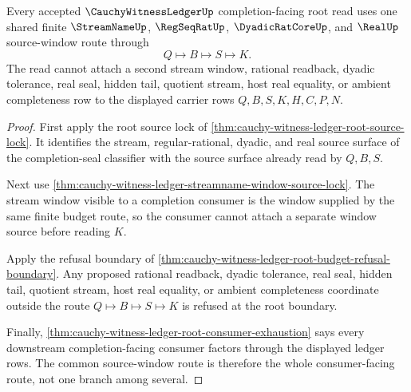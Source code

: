 \begin{theorem}
\label{thm:cauchy-witness-ledger-root-source-window-route-lock}
Every accepted $\CauchyWitnessLedgerUp$ completion-facing root read uses one shared finite $\StreamNameUp$, $\RegSeqRatUp$, $\DyadicRatCoreUp$, and $\RealUp$ source-window route through
$$
Q \longmapsto B \longmapsto S \longmapsto K.
$$
The read cannot attach a second stream window, rational readback, dyadic tolerance, real seal, hidden tail, quotient stream, host real equality, or ambient completeness row to the displayed carrier rows $Q,B,S,K,H,C,P,N$.
\end{theorem}
\begin{proof}
First apply the root source lock of \autoref{thm:cauchy-witness-ledger-root-source-lock}. It identifies the stream, regular-rational, dyadic, and real source surface of the completion-seal classifier with the source surface already read by $Q,B,S$.

Next use \autoref{thm:cauchy-witness-ledger-streamname-window-source-lock}. The stream window visible to a completion consumer is the window supplied by the same finite budget route, so the consumer cannot attach a separate window source before reading $K$.

Apply the refusal boundary of \autoref{thm:cauchy-witness-ledger-root-budget-refusal-boundary}. Any proposed rational readback, dyadic tolerance, real seal, hidden tail, quotient stream, host real equality, or ambient completeness coordinate outside the route $Q \longmapsto B \longmapsto S \longmapsto K$ is refused at the root boundary.

Finally, \autoref{thm:cauchy-witness-ledger-root-consumer-exhaustion} says every downstream completion-facing consumer factors through the displayed ledger rows. The common source-window route is therefore the whole consumer-facing route, not one branch among several.
\end{proof}

